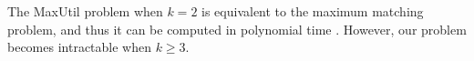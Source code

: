 \documentclass[sigconf]{aamas}
\begin{document}
The MaxUtil problem when $k=2$ is equivalent to the maximum matching problem, and thus it can be computed in polynomial time \cite{edmons1965paths}.
However, our problem becomes intractable when $k \geq 3$. 
\end{document}
